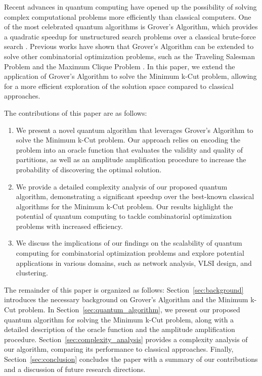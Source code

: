 Recent advances in quantum computing have opened up the possibility of solving complex computational problems more efficiently than classical computers. One of the most celebrated quantum algorithms is Grover's Algorithm, which provides a quadratic speedup for unstructured search problems over a classical brute-force search \cite{Grover1996}. Previous works have shown that Grover's Algorithm can be extended to solve other combinatorial optimization problems, such as the Traveling Salesman Problem \cite{PaparoPeruzzo2012} and the Maximum Clique Problem \cite{DaskinKais2011}. In this paper, we extend the application of Grover's Algorithm to solve the Minimum k-Cut problem, allowing for a more efficient exploration of the solution space compared to classical approaches.

The contributions of this paper are as follows:

\begin{enumerate}
    \item We present a novel quantum algorithm that leverages Grover's Algorithm to solve the Minimum k-Cut problem. Our approach relies on encoding the problem into an oracle function that evaluates the validity and quality of partitions, as well as an amplitude amplification procedure to increase the probability of discovering the optimal solution.
    
    \item We provide a detailed complexity analysis of our proposed quantum algorithm, demonstrating a significant speedup over the best-known classical algorithms for the Minimum k-Cut problem. Our results highlight the potential of quantum computing to tackle combinatorial optimization problems with increased efficiency.
    
    \item We discuss the implications of our findings on the scalability of quantum computing for combinatorial optimization problems and explore potential applications in various domains, such as network analysis, VLSI design, and clustering.
\end{enumerate}

The remainder of this paper is organized as follows: Section~\ref{sec:background} introduces the necessary background on Grover's Algorithm and the Minimum k-Cut problem. In Section~\ref{sec:quantum_algorithm}, we present our proposed quantum algorithm for solving the Minimum k-Cut problem, along with a detailed description of the oracle function and the amplitude amplification procedure. Section~\ref{sec:complexity_analysis} provides a complexity analysis of our algorithm, comparing its performance to classical approaches. Finally, Section~\ref{sec:conclusion} concludes the paper with a summary of our contributions and a discussion of future research directions.



